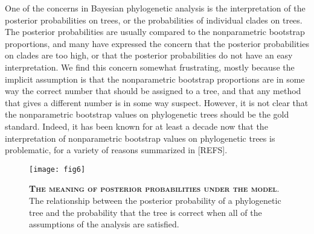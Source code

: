 \documentclass{svmult}
\begin{document}
One of the concerns in Bayesian phylogenetic analysis is the interpretation of the posterior probabilities on trees, or the probabilities of individual clades on
trees. The posterior probabilities are usually compared to the nonparametric bootstrap proportions, and many have expressed the concern that the posterior
probabilities on clades are too high, or that the posterior probabilities do not have an easy interpretation. We find this concern somewhat frustrating, mostly because
the implicit assumption is that the nonparametric bootstrap proportions are in some way the correct number that should be assigned to a tree, and that any
method that gives a different number is in some way suspect. However, it is not clear that the nonparametric bootstrap values on phylogenetic trees should
be the gold standard. Indeed, it has been known for at least a decade now that the interpretation of nonparametric bootstrap values on phylogenetic trees
is problematic, for a variety of reasons summarized in [REFS]. 

\begin{figure}[t]
\centering
\texttt{[image: fig6]}
\caption{\textbf{\textsc{The meaning of posterior probabilities under the model}}.
The relationship between the posterior probability of a phylogenetic tree and the probability that the tree is correct when all of the assumptions of
the analysis are satisfied. }
\label{fig6}
\end{figure}
\end{document}
